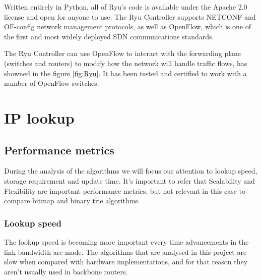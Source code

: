 \documentclass[]{report}
\begin{document}
Written entirely in Python, all of Ryu’s code is available under the Apache 2.0 license and open for anyone to use. The Ryu Controller supports NETCONF and OF-config network management protocols, as well as OpenFlow, which is one of the first and most widely deployed SDN communications standards.

The Ryu Controller can use OpenFlow to interact with the forwarding plane (switches and routers) to modify how the network will handle traffic flows, has showned in the figure \ref{fig:Ryu}. It has been tested and certified to work with a number of OpenFlow switches.

\begin{minipage}{\linewidth}%

\label{fig:Ryu}
\end{minipage}

\section{IP lookup}
\subsection{Performance metrics}
	During the analysis of the algorithms we will focus our attention to lookup speed, storage requirement and update time. It’s important to refer that Scalability and Flexibility are important performance metrics, but not relevant in this case to compare bitmap and binary trie algorithms.
\subsubsection{Lookup speed}
	The lookup speed is becoming more important every time advancements in the link bandwidth are made. The algorithms that are analysed in this project are slow when compared with hardware implementations, and for that reason they aren’t usually used in backbone routers.
\end{document}

